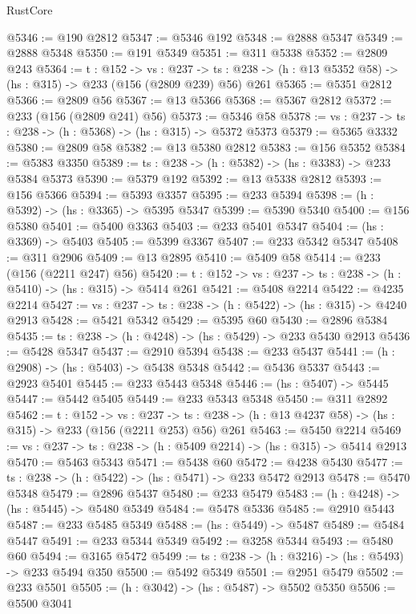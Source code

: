\begin{lexlean}{RustCore}
\begin{coremodule}
@5346 := @190 @2812
@5347 := @5346 @192
@5348 := @2888 @5347
@5349 := @2888 @5348
@5350 := @191 @5349
@5351 := @311 @5338
@5352 := @2809 @243
@5364 := {t : @152} ->
  {vs : @237} ->
  {ts : @238} -> (h : @13 @5352 @58) -> (hs : @315) -> @233 (@156 (@2809 @239) @56) @261
@5365 := @5351 @2812
@5366 := @2809 @56
@5367 := @13 @5366
@5368 := @5367 @2812
@5372 := @233 (@156 (@2809 @241) @56)
@5373 := @5346 @58
@5378 := {vs : @237} -> {ts : @238} -> (h : @5368) -> (hs : @315) -> @5372 @5373
@5379 := @5365 @3332
@5380 := @2809 @58
@5382 := @13 @5380 @2812
@5383 := @156 @5352
@5384 := @5383 @3350
@5389 := {ts : @238} -> (h : @5382) -> (hs : @3383) -> @233 @5384 @5373
@5390 := @5379 @192
@5392 := @13 @5338 @2812
@5393 := @156 @5366
@5394 := @5393 @3357
@5395 := @233 @5394
@5398 := (h : @5392) -> (hs : @3365) -> @5395 @5347
@5399 := @5390 @5340
@5400 := @156 @5380
@5401 := @5400 @3363
@5403 := @233 @5401 @5347
@5404 := (hs : @3369) -> @5403
@5405 := @5399 @3367
@5407 := @233 @5342 @5347
@5408 := @311 @2906
@5409 := @13 @2895
@5410 := @5409 @58
@5414 := @233 (@156 (@2211 @247) @56)
@5420 := {t : @152} -> {vs : @237} -> {ts : @238} -> (h : @5410) -> (hs : @315) -> @5414 @261
@5421 := @5408 @2214
@5422 := @4235 @2214
@5427 := {vs : @237} -> {ts : @238} -> (h : @5422) -> (hs : @315) -> @4240 @2913
@5428 := @5421 @5342
@5429 := @5395 @60
@5430 := @2896 @5384
@5435 := {ts : @238} -> (h : @4248) -> (hs : @5429) -> @233 @5430 @2913
@5436 := @5428 @5347
@5437 := @2910 @5394
@5438 := @233 @5437
@5441 := (h : @2908) -> (hs : @5403) -> @5438 @5348
@5442 := @5436 @5337
@5443 := @2923 @5401
@5445 := @233 @5443 @5348
@5446 := (hs : @5407) -> @5445
@5447 := @5442 @5405
@5449 := @233 @5343 @5348
@5450 := @311 @2892
@5462 := {t : @152} ->
  {vs : @237} ->
  {ts : @238} -> (h : @13 @4237 @58) -> (hs : @315) -> @233 (@156 (@2211 @253) @56) @261
@5463 := @5450 @2214
@5469 := {vs : @237} -> {ts : @238} -> (h : @5409 @2214) -> (hs : @315) -> @5414 @2913
@5470 := @5463 @5343
@5471 := @5438 @60
@5472 := @4238 @5430
@5477 := {ts : @238} -> (h : @5422) -> (hs : @5471) -> @233 @5472 @2913
@5478 := @5470 @5348
@5479 := @2896 @5437
@5480 := @233 @5479
@5483 := (h : @4248) -> (hs : @5445) -> @5480 @5349
@5484 := @5478 @5336
@5485 := @2910 @5443
@5487 := @233 @5485 @5349
@5488 := (hs : @5449) -> @5487
@5489 := @5484 @5447
@5491 := @233 @5344 @5349
@5492 := @3258 @5344
@5493 := @5480 @60
@5494 := @3165 @5472
@5499 := {ts : @238} -> (h : @3216) -> (hs : @5493) -> @233 @5494 @350
@5500 := @5492 @5349
@5501 := @2951 @5479
@5502 := @233 @5501
@5505 := (h : @3042) -> (hs : @5487) -> @5502 @5350
@5506 := @5500 @3041

\end{coremodule}
\end{lexlean}
